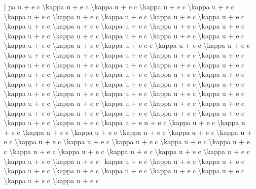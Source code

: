 \documentclass[
]{article}
\begin{document}
{{{[} pa u + e c \textbackslash kappa u + e c \textbackslash kappa u + e c
\textbackslash kappa u + e c \textbackslash kappa u + e c
\textbackslash kappa u + e c \textbackslash kappa u + e c
\textbackslash kappa u + e c \textbackslash kappa u + e c
\textbackslash kappa u + e c \textbackslash kappa u + e c
\textbackslash kappa u + e c \textbackslash kappa u + e c
\textbackslash kappa u + e c \textbackslash kappa u + e c
\textbackslash kappa u + e c \textbackslash kappa u + e c
\textbackslash kappa u + e c \textbackslash kappa u + e c
\textbackslash kappa u + e c \textbackslash kappa u + e c
\textbackslash kappa u + e c \textbackslash kappa u + e e c
\textbackslash kappa u + e c \textbackslash kappa u + e c
\textbackslash kappa u + e c \textbackslash kappa u + e c
\textbackslash kappa u + e c \textbackslash kappa u + e c
\textbackslash kappa u + e c \textbackslash kappa u + e c
\textbackslash kappa u + e c \textbackslash kappa u + e c
\textbackslash kappa u + e c \textbackslash kappa u + e c
\textbackslash kappa u + e c \textbackslash kappa u + e c
\textbackslash kappa u + e c \textbackslash kappa u + e c
\textbackslash kappa u + e c \textbackslash kappa u + e c
\textbackslash kappa u + e c \textbackslash kappa u + e c
\textbackslash kappa u + e c \textbackslash kappa u + e c
\textbackslash kappa u + e c \textbackslash kappa u + e c
\textbackslash kappa u + e c \textbackslash kappa u + e c
\textbackslash kappa u + e c \textbackslash kappa u + e c
\textbackslash kappa u + e c \textbackslash kappa u + e c
\textbackslash kappa u + e c \textbackslash kappa u + e c
\textbackslash kappa u + e c \textbackslash kappa u + e c
\textbackslash kappa u + e c \textbackslash kappa u + e c
\textbackslash kappa u + e c \textbackslash kappa u + e c
\textbackslash kappa u + e c \textbackslash kappa u + e u + e c
\textbackslash kappa u + e c \textbackslash kappa u + e c
\textbackslash kappa u + e c \textbackslash kappa u + e c
\textbackslash kappa u + e c \textbackslash kappa u + e c
\textbackslash kappa u + e c \textbackslash kappa u + e c
\textbackslash kappa u + e c \textbackslash kappa u + e c
\textbackslash kappa u + e c \textbackslash kappa u + e c
\textbackslash kappa u + e c \textbackslash kappa u + e c
\textbackslash kappa u + e c \textbackslash kappa u + e c
\textbackslash kappa u + e c \textbackslash kappa u + e c
\textbackslash kappa u + e c ~kappa u + e c \textbackslash kappa u + e c
\textbackslash kappa u + e c \textbackslash kappa u + e c
\textbackslash kappa u + e c \textbackslash kappa u + e c
\textbackslash kappa u + e c \textbackslash kappa u + e c
\textbackslash kappa u + e c \textbackslash kappa u + e c
}}
\end{document}
